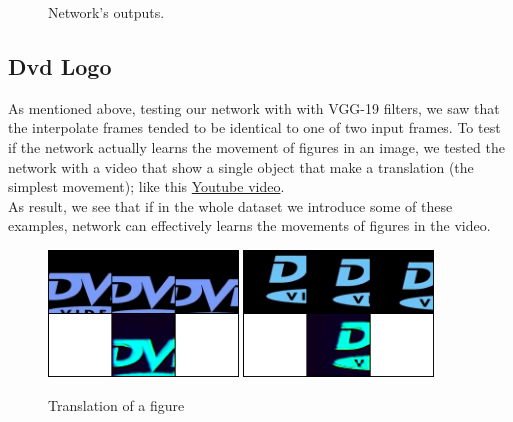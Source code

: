 \documentclass[11pt, a4paper]{article}
\begin{document}
\begin{figure}
		\caption{Network's outputs.}
		\label{output}
	\end{figure}
	
	
	\subsection{Dvd Logo}
	As mentioned above, testing our network with with VGG-19 filters, we saw that the interpolate frames tended to be identical to one of two input frames. To test if the network actually learns the movement of figures in an image, we tested the network with a video that show a single object that make a translation (the simplest movement); like this \href{https://www.youtube.com/watch?v=5mGuCdlCcNM}{Youtube video}.\\
	As result, we see that if in the whole dataset we introduce some of these examples, network can effectively learns the movements of figures in the video.
	
	\begin{figure}[H]
		\centering
		\includegraphics[width=0.45\textwidth]{dvd1}
		\includegraphics[width=0.45\textwidth]{dvd2}
		\caption{Translation of a figure}
		\label{dvd}
	\end{figure} 
	
\end{document}

